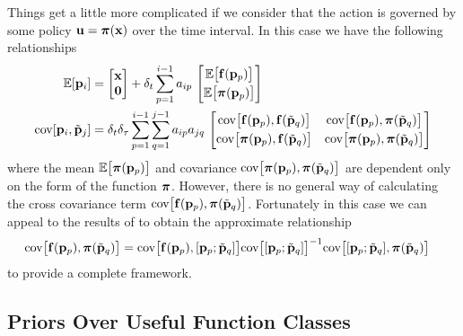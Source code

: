 Things get a little more complicated if we consider that the action is governed by some policy $\bu = \bpi(\bx)$ over the time interval.  In this case we have the following relationships
\begin{align*}
\EE[\bp_i] &= \bmat{ \bx \\ \bO} + \Dt \sum_{p=1}^{i-1} a_{ip}\, 
\bmat{ \EE\big[\bff(\bp_p)\big] \\[0.1cm] \EE\big[\bpi(\bp_p)\big] }  \\
\cov[\bp_i, \tbp_j] &= \Dt \delta_{\tau} \sum_{p=1}^{i-1} \sum_{q=1}^{j-1} a_{ip} a_{jq}\,
\bmat{ 
\cov\big[\bff(\bp_p), \bff(\tbp_q)\big] & \cov\big[\bff(\bp_p), \bpi(\tbp_q)\big] \\[0.1cm] 
\cov\big[\bpi(\bp_p), \bff(\tbp_q)\big] & \cov\big[\bpi(\bp_p), \bpi(\tbp_q)\big] }
\end{align*}
where the mean $\EE\big[\bpi(\bp_p)\big]$ and covariance $\cov\big[\bpi(\bp_p), \bpi(\tbp_q)\big]$ are dependent only on the form of the function $\bpi$. However, there is no general way of calculating the cross covariance term $\cov\big[\bff(\bp_p), \bpi(\tbp_q)\big]$. Fortunately in this case we can appeal to the results of  to obtain the approximate relationship
\begin{align*}
\cov\big[\bff(\bp_p), \bpi(\tbp_q)\big] &= 
\cov\big[\bff(\bp_p), [\bp_p;\tbp_q] \big]
\cov\big[[\bp_p;\tbp_q]\big]\inv
\cov\big[[\bp_p;\tbp_q], \bpi(\tbp_q)\big]
\end{align*}
to provide a complete framework.





\subsection{Priors Over Useful Function Classes} \label{sec:usekernels}
